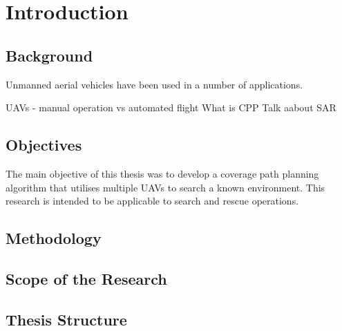 \chapter{Introduction}
\label{chp:intro}


\section{Background}

Unmanned aerial vehicles have been used in a number of applications. 

UAVs - manual operation vs automated flight
What is CPP
Talk aabout SAR


\section{Objectives}

The main objective of this thesis was to develop a coverage path planning algorithm that utilises multiple UAVs to search a known environment. This research is intended to be applicable to search and rescue operations.\linebreak
\cite{CPP-Survey-2019}


\section{Methodology}

\section{Scope of the Research}

\section{Thesis Structure}
